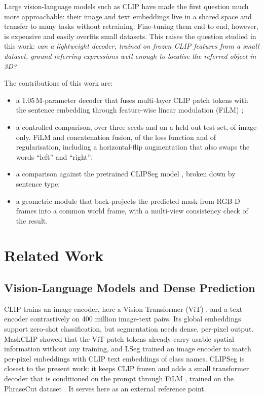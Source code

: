 \documentclass[conference,a4paper]{IEEEtran}
\begin{document}
Large vision-language models such as CLIP \cite{radford2021clip} have made the first question much
more approachable: their image and text embeddings live in a shared space and transfer to many
tasks without retraining. Fine-tuning them end to end, however, is expensive and easily overfits
small datasets. This raises the question studied in this work: \emph{can a lightweight decoder,
trained on frozen CLIP features from a small dataset, ground referring expressions well enough to
localise the referred object in 3D?}

The contributions of this work are:
\begin{itemize}[\setlength{\IEEElabelindent}{0pt}]
\item a 1.05\,M-parameter decoder that fuses multi-layer CLIP patch tokens with the sentence
  embedding through feature-wise linear modulation (FiLM) \cite{perez2018film};
\item a controlled comparison, over three seeds and on a held-out test set, of image-only, FiLM and
  concatenation fusion, of the loss function and of regularisation, including a horizontal-flip
  augmentation that also swaps the words \enquote{left} and \enquote{right};
\item a comparison against the pretrained CLIPSeg model \cite{luddecke2022clipseg}, broken down by
  sentence type;
\item a geometric module that back-projects the predicted mask from RGB-D frames into a common world
  frame, with a multi-view consistency check of the result.
\end{itemize}

\section{Related Work}
\label{sec:related}

\subsection{Vision-Language Models and Dense Prediction}

CLIP \cite{radford2021clip} trains an image encoder, here a Vision Transformer (ViT)
\cite{dosovitskiy2021vit}, and a text encoder contrastively on 400 million image-text pairs. Its
global embeddings support zero-shot classification, but segmentation needs dense, per-pixel output.
MaskCLIP \cite{zhou2022maskclip} showed that the ViT patch tokens already carry usable spatial
information without any training, and LSeg \cite{li2022lseg} trained an image encoder to match
per-pixel embeddings with CLIP text embeddings of class names. CLIPSeg \cite{luddecke2022clipseg} is
closest to the present work: it keeps CLIP frozen and adds a small transformer decoder that is conditioned
on the prompt through FiLM \cite{perez2018film}, trained on the PhraseCut dataset
\cite{wu2020phrasecut}. It serves here as an external reference point.
\end{document}
